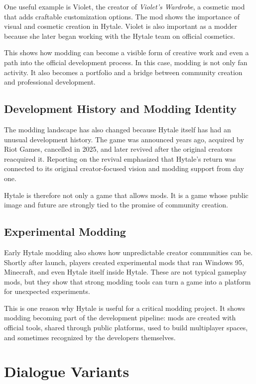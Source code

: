 One useful example is Violet,
the creator of \textit{Violet's Wardrobe},
a cosmetic mod that adds craftable customization options.
The mod shows the importance of visual and cosmetic creation in Hytale.
Violet is also important as a modder because she later began working with
the Hytale team on official cosmetics.

This shows how modding can become a visible form of creative work
and even a path into the official development process.
In this case,
modding is not only fan activity.
It also becomes a portfolio
and a bridge between community creation and professional development.

\subsection{Development History and Modding Identity}

The modding landscape has also changed because Hytale itself has had an unusual
development history.
The game was announced years ago,
acquired by Riot Games,
cancelled in 2025,
and later revived after the original creators reacquired it.
Reporting on the revival emphasized that Hytale's return was connected to its
original creator-focused vision and modding support from day one.

Hytale is therefore not only a game that allows mods.
It is a game whose public image and future are strongly tied to the promise
of community creation.

\subsection{Experimental Modding}

Early Hytale modding also shows how unpredictable creator communities can be.
Shortly after launch,
players created experimental mods that ran Windows 95,
Minecraft,
and even Hytale itself inside Hytale.
These are not typical gameplay mods,
but they show that strong modding tools can turn a game into a platform
for unexpected experiments.

This is one reason why Hytale is useful for a critical modding project.
It shows modding becoming part of the development pipeline:
mods are created with official tools,
shared through public platforms,
used to build multiplayer spaces,
and sometimes recognized by the developers themselves.


\section{Dialogue Variants}
\label{app:dialogue}

